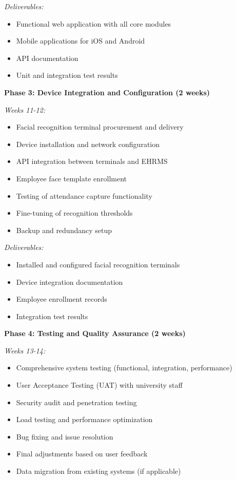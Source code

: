 \documentclass[12pt]{article}
\begin{document}
\textit{Deliverables:}
\begin{itemize}[noitemsep]
\item Functional web application with all core modules
\item Mobile applications for iOS and Android
\item API documentation
\item Unit and integration test results
\end{itemize}

\textbf{Phase 3: Device Integration and Configuration (2 weeks)}

\textit{Weeks 11-12:}
\begin{itemize}[noitemsep]
\item Facial recognition terminal procurement and delivery
\item Device installation and network configuration
\item API integration between terminals and EHRMS
\item Employee face template enrollment
\item Testing of attendance capture functionality
\item Fine-tuning of recognition thresholds
\item Backup and redundancy setup
\end{itemize}

\textit{Deliverables:}
\begin{itemize}[noitemsep]
\item Installed and configured facial recognition terminals
\item Device integration documentation
\item Employee enrollment records
\item Integration test results
\end{itemize}

\textbf{Phase 4: Testing and Quality Assurance (2 weeks)}

\textit{Weeks 13-14:}
\begin{itemize}[noitemsep]
\item Comprehensive system testing (functional, integration, performance)
\item User Acceptance Testing (UAT) with university staff
\item Security audit and penetration testing
\item Load testing and performance optimization
\item Bug fixing and issue resolution
\item Final adjustments based on user feedback
\item Data migration from existing systems (if applicable)
\end{itemize}
\end{document}
